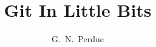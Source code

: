 \documentclass[12pt,epsfig,epsf]{article}
\begin{document}
\linenumbers

\title{Git In Little Bits}

\author[1]{G.~N.~Perdue}
\affil[1]{\FNAL}

\maketitle







%
\end{document}
